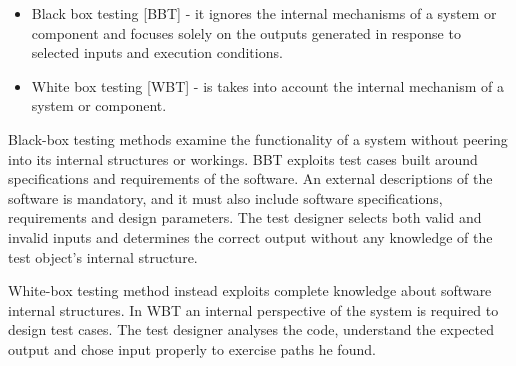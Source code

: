 \begin{itemize}
\item Black box testing [BBT] - it ignores the internal mechanisms of a system or component and focuses solely on the outputs
generated in response to selected inputs and execution conditions.
\item White box testing [WBT] - is takes into account the internal mechanism of a system or component. 
\end{itemize} 

Black-box testing  methods  examine the functionality of a system without peering into its internal structures or workings. BBT exploits test cases built around specifications and requirements of the software. An external descriptions of the software is mandatory, and it must also include software specifications, requirements and design parameters.  The test designer selects both valid and invalid inputs and determines the correct output without any knowledge of the test object's internal structure.

White-box testing  method instead exploits complete knowledge about software internal structures. In WBT an internal perspective of the system is required to design test cases. The test designer analyses the code, understand the expected output and chose input properly  to exercise paths he found. 

